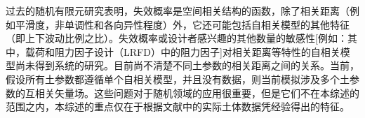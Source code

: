 \begin{ParaColumn}
    \switchcolumn

    过去的随机有限元研究表明，失效概率是空间相关结构的函数，除了相关距离（例如平滑度，非单调性和各向异性程度）外，它还可能包括自相关模型的其他特征（即上下波动比例之比）。失效概率或设计者感兴趣的其他数量的敏感性[例如：其中，载荷和阻力因子设计（LRFD）中的阻力因子]对相关距离等特性的自相关模型尚未得到系统的研究。目前尚不清楚不同土参数的相关距离之间的关系。当前，假设所有土参数都遵循单个自相关模型，并且没有数据，则当前模拟涉及多个土参数的互相关矢量场。这些问题对于随机领域的应用很重要，但是它们不在本综述的范围之内，本综述的重点仅在于根据文献中的实际土体数据凭经验得出的特征。
    
\end{ParaColumn}